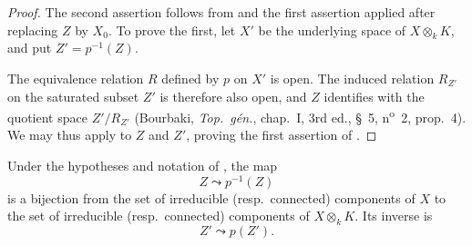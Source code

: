\begin{proof}
The second assertion follows from  and the first assertion
applied after replacing $Z$ by $X_0$.
To prove the first, let $X'$ be the underlying space of
$X\otimes_k K$, and put $Z'=p^{-1}(Z)$.


The equivalence relation $R$ defined by $p$ on $X'$ is open.
The induced relation $R_{Z'}$ on the saturated subset $Z'$ is therefore
also open, and $Z$ identifies with the quotient space $Z'/R_{Z'}$
(Bourbaki, \emph{Top.\ g\'en.}, chap.~I, 3rd ed., \S~5, n\textsuperscript{o}~2,
prop.~4).
We may thus apply  to $Z$ and $Z'$, proving the first
assertion of .
\end{proof}

\begin{corollary}[4.4.6]
\label{IV.4.4.6}
Under the hypotheses and notation of , the map
\[
Z\leadsto p^{-1}(Z)
\]
is a bijection from the set of irreducible \textup{(resp.\ }connected\textup{)}
components of $X$ to the set of irreducible \textup{(resp.\ }connected\textup{)}
components of $X\otimes_k K$.
Its inverse is
\[
Z'\leadsto p(Z').
\]
\end{corollary}
